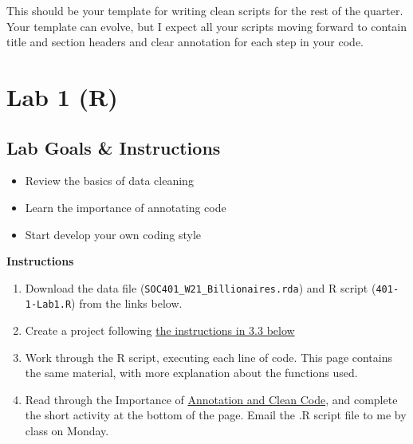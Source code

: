 \documentclass[
]{book}
\providecommand{\tightlist}{%
  \setlength{\itemsep}{0pt}\setlength{\parskip}{0pt}}
\begin{document}
This should be your template for writing clean scripts for the rest of the quarter. Your template can evolve, but I expect all your scripts moving forward to contain title and section headers and clear annotation for each step in your code.

\hypertarget{lab-1-r}{%
\chapter{Lab 1 (R)}\label{lab-1-r}}

\hypertarget{lab-goals-instructions-1}{%
\section{Lab Goals \& Instructions}\label{lab-goals-instructions-1}}

\begin{itemize}
\tightlist
\item
  Review the basics of data cleaning\\
\item
  Learn the importance of annotating code
\item
  Start develop your own coding style
\end{itemize}

\textbf{Instructions}

\begin{enumerate}
\def\labelenumi{\arabic{enumi}.}
\tightlist
\item
  Download the data file (\texttt{SOC401\_W21\_Billionaires.rda}) and R script (\texttt{401-1-Lab1.R}) from the links below.
\item
  Create a project following \protect\hyperlink{project}{the instructions in 3.3 below}
\item
  Work through the R script, executing each line of code. This page contains the same material, with more explanation about the functions used.
\item
  Read through the Importance of \protect\hyperlink{annotate}{Annotation and Clean Code}, and complete the short activity at the bottom of the page. Email the .R script file to me by class on Monday.
\end{enumerate}
\end{document}
